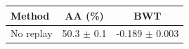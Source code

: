 \begin{tabular}{lcc}
\toprule
\textbf{Method} & \textbf{AA (\%)} & \textbf{BWT} \\
\midrule
No replay & 50.3 $\pm$ 0.1 & -0.189 $\pm$ 0.003 \\
\bottomrule
\end{tabular}
